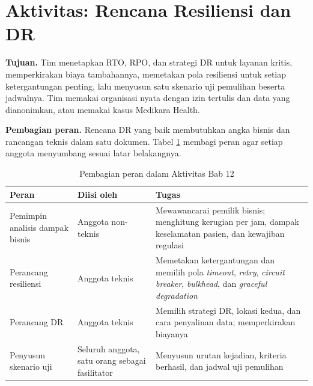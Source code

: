\section{Aktivitas: Rencana Resiliensi dan DR}
\label{sec:ch12-aktivitas}

\textbf{Tujuan.} Tim menetapkan RTO, RPO, dan strategi DR untuk layanan kritis, memperkirakan biaya
tambahannya, memetakan pola resiliensi untuk setiap ketergantungan penting, lalu menyusun satu
skenario uji pemulihan beserta jadwalnya. Tim memakai organisasi nyata dengan izin tertulis dan data
yang dianonimkan, atau memakai kasus Medikara Health.

\textbf{Pembagian peran.} Rencana DR yang baik membutuhkan angka bisnis dan rancangan teknis dalam
satu dokumen. Tabel \ref{tab:ch12-peran} membagi peran agar setiap anggota menyumbang sesuai latar
belakangnya.

\begin{table}[!htb]
  \centering
  \caption{Pembagian peran dalam Aktivitas Bab 12}
  \label{tab:ch12-peran}
  \footnotesize
  \begin{tabularx}{\textwidth}{>{\raggedright\arraybackslash}p{2.8cm} >{\raggedright\arraybackslash}p{2.8cm} >{\raggedright\arraybackslash}X}
    \hline
    \textbf{Peran} & \textbf{Diisi oleh} & \textbf{Tugas} \\ \hline
    Pemimpin analisis dampak bisnis & Anggota non-teknis & Mewawancarai pemilik bisnis; menghitung
      kerugian per jam, dampak keselamatan pasien, dan kewajiban regulasi \\ \hline
    Perancang resiliensi & Anggota teknis & Memetakan ketergantungan dan memilih pola
      \textit{timeout}, \textit{retry}, \textit{circuit breaker}, \textit{bulkhead}, dan
      \textit{graceful degradation} \\ \hline
    Perancang DR & Anggota teknis & Memilih strategi DR, lokasi kedua, dan cara penyalinan data;
      memperkirakan biayanya \\ \hline
    Penyusun skenario uji & Seluruh anggota, satu orang sebagai fasilitator & Menyusun urutan
      kejadian, kriteria berhasil, dan jadwal uji pemulihan \\ \hline
  \end{tabularx}
\end{table}

